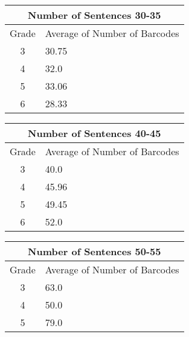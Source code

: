 \begin{figure}[H]
  \begin{minipage}[t]{0.33\textwidth}
  \centering
  \begin{tabular}{|c|p{2.5cm}|}
  \hline
  \multicolumn{2}{|c|}{Number of Sentences 30-35} \\
  \hline
  Grade & Average of Number of Barcodes \\
  \hline
  3 & 30.75 \\
  4 & 32.0 \\
  5 & 33.06 \\
  6 & 28.33 \\
  \hline
  \end{tabular}
  \end{minipage}%
  \begin{minipage}[t]{0.33\textwidth}
  \centering
  \begin{tabular}{|c|p{2.5cm}|}
  \hline
  \multicolumn{2}{|c|}{Number of Sentences 40-45} \\
  \hline
  Grade & Average of Number of Barcodes \\
  \hline
  3 & 40.0 \\
  4 & 45.96 \\
  5 & 49.45 \\
  6 & 52.0 \\
  \hline
  \end{tabular}
  \end{minipage}%
  \begin{minipage}[t]{0.33\textwidth}
  \centering
  \begin{tabular}{|c|p{2.5cm}|}
  \hline
  \multicolumn{2}{|c|}{Number of Sentences 50-55} \\
  \hline
  Grade & Average of Number of Barcodes \\
  \hline
  3 & 63.0 \\
  4 & 50.0 \\
  5 & 79.0 \\
  \hline
  \end{tabular}
  \end{minipage}

\end{figure}
